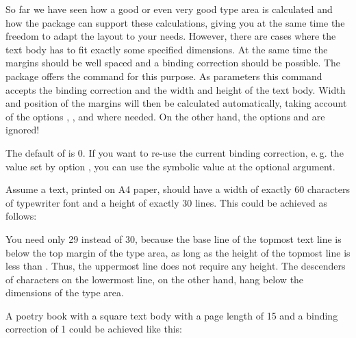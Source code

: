 \begin{Declaration}
\end{Declaration}%
So far we have seen how a good or even very good
type area is calculated and how the
 package can support these calculations, giving you
at the same time the freedom to adapt the layout to your needs.
However, there are cases where the text body has to fit exactly some
specified dimensions. At the same time the margins should be well
spaced and a binding correction should be possible. The
 package offers the command  for this
purpose. As parameters this command accepts the binding correction and
the width and height of the text body.  Width and position of the
margins will then be calculated automatically, taking account of the
options , ,
 and  where
needed.  On the other hand, the options
 and
 are ignored!

The default of  is 0. If you want to re-use the current
binding correction, e.\,g. the value set by option
, you can use the symbolic value
 at the optional argument.

\begin{Example}
  Assume a text, printed on A4 paper, should have a width of exactly 60
  characters of typewriter font and a height of exactly 30 lines. This could
  be achieved as follows:
You need only 29 instead of 30, because the base line of the topmost
text line is  below the top margin of the type area, as
long as the height of the topmost line is less than
. Thus, the uppermost line does not require any
height. The descenders of characters on the lowermost line, on the
other hand, hang below the dimensions of the type area.

\item A poetry book with a square text body with a page length of
  15 and a binding correction of 1 could be
  achieved like this:
\end{Example}
\EndIndexGroup



